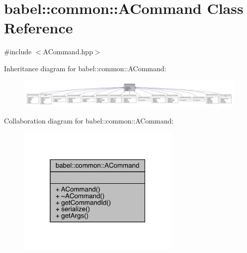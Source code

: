 \hypertarget{classbabel_1_1common_1_1_a_command}{}\section{babel\+:\+:common\+:\+:A\+Command Class Reference}
\label{classbabel_1_1common_1_1_a_command}


{\ttfamily \#include $<$A\+Command.\+hpp$>$}



Inheritance diagram for babel\+:\+:common\+:\+:A\+Command\+:\nopagebreak
\begin{figure}[H]
\begin{center}
\leavevmode
\includegraphics[width=350pt]{classbabel_1_1common_1_1_a_command__inherit__graph}
\end{center}
\end{figure}


Collaboration diagram for babel\+:\+:common\+:\+:A\+Command\+:\nopagebreak
\begin{figure}[H]
\begin{center}
\leavevmode
\includegraphics[width=223pt]{classbabel_1_1common_1_1_a_command__coll__graph}
\end{center}
\end{figure}
